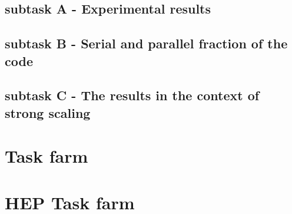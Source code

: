 \documentclass{article}
\begin{document}
\subsection{subtask A - Experimental results}


\subsection{subtask B - Serial and parallel fraction of the code}


\subsection{subtask C - The results in the context of strong scaling}


\section{Task farm}
\label{sec: task farm source}


\section{HEP Task farm}
\label{sec: task farm hep source}

\end{document}
